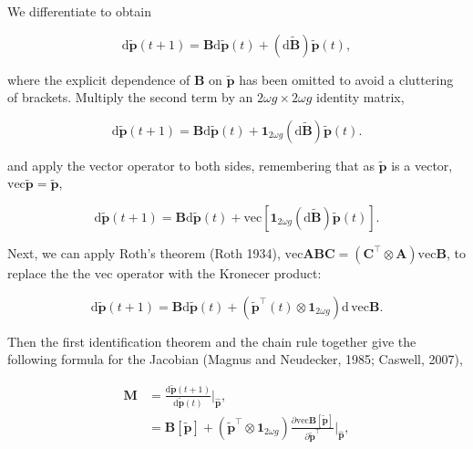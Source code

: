 \documentclass[11pt]{article}
\def\mbf#1{\mathbf{#1}}
\begin{document}
\noindent We differentiate to obtain

\begin{equation} 
	\text{d} \tilde{\mbf{p}}(t + 1) = \mbf{B}\text{d} \tilde{\mbf{p}}(t) + \left(\text{d} \tilde{\mbf{B}} \right) \tilde{\mbf{p}}(t),
\end{equation}

\noindent where the explicit dependence of $\mbf{B}$ on $\tilde{\mbf{p}}$ has been omitted to avoid a cluttering of brackets. Multiply the second term by an $2 \omega g \times 2 \omega g$ identity matrix,

\begin{equation} 
	\text{d} \tilde{\mbf{p}}(t + 1) = \mbf{B}\text{d} \tilde{\mbf{p}}(t) + \mbf{1}_{2 \omega g} \left(\text{d} \tilde{\mbf{B}} \right) \tilde{\mbf{p}}(t).
\end{equation}

\noindent and apply the vector operator to both sides, remembering that as $\tilde{\mbf{p}}$ is a vector, $\text{vec}\tilde{\mbf{p}} = \tilde{\mbf{p}}$,

\begin{equation} 
	\text{d} \tilde{\mbf{p}}(t + 1) = \mbf{B}\text{d} \tilde{\mbf{p}}(t) + \text{vec} \left[ \mbf{1}_{2 \omega g} \left(\text{d} \tilde{\mbf{B}} \right) \tilde{\mbf{p}}(t) \right].
\end{equation}

\noindent Next, we can apply Roth's theorem (Roth 1934), $\text{vec}\mbf{ABC} = \left( \mbf{C}^{\intercal} \otimes \mbf{A} \right) \text{vec}\mbf{B}$, to replace the the $\text{vec}$ operator with the Kronecer product:

\begin{equation} 
	\text{d} \tilde{\mbf{p}}(t + 1) = \mbf{B}\text{d} \tilde{\mbf{p}}(t) + \left( \tilde{\mbf{p}}^{\intercal}(t) \otimes \mbf{1}_{2 \omega g} \right) \text{d}\,\text{vec}\mbf{B}.
\end{equation}

\noindent Then the first identification theorem and the chain rule together give the following formula for the Jacobian (Magnus and Neudecker, 1985; Caswell, 2007),

\begin{align*} \label{eq:genJacobian}
	\mbf{M} &=  \frac{ \text{d} \tilde{\mbf{p}}(t + 1) }{ \text{d} \tilde{\mbf{p}}(t) } \bigg\rvert_{\hat{\mbf{p}}}, \\
			&= \mbf{B}[\tilde{\mbf{p}}] + \left( \tilde{\mbf{p}}^{\intercal} \otimes \mbf{1}_{2 \omega g} \right) \frac{ \partial \text{vec}{\mbf{B}[\tilde{\mbf{p}}]} }{ \partial \tilde{\mbf{p}}^{\intercal} } \bigg\rvert_{\hat{\mbf{p}}},
\end{align*}
\end{document}
